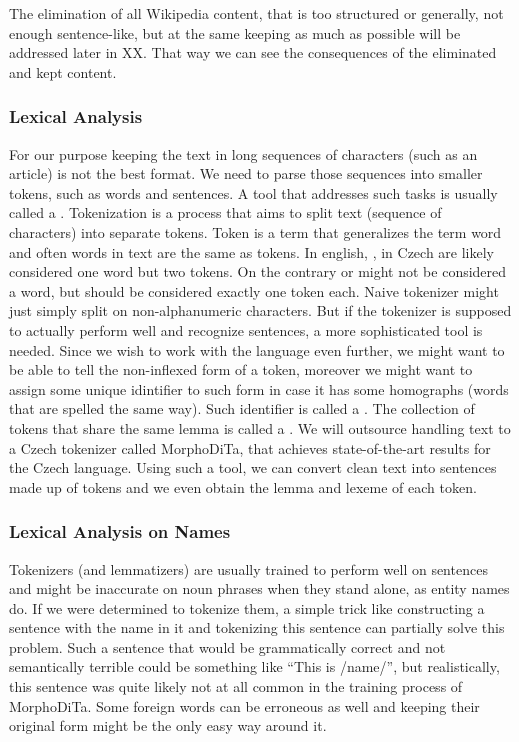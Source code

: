 The elimination of all Wikipedia content, that is too structured or generally, not enough sentence-like, but at the same keeping as much as possible will be addressed later in XX. That way we can see the consequences of the eliminated and kept content.


\subsubsection{Lexical Analysis}
For our purpose keeping the text in long sequences of characters (such as an article) is not the best format. We need to parse those sequences into smaller tokens, such as words and sentences. A tool that addresses such tasks is usually called a .
Tokenization is a process that aims to split text (sequence of characters) into separate tokens. Token is a term that generalizes the term word and often words in text are the same as tokens. In english, , in Czech  are likely considered one word but two tokens. On the contrary  or  might not be considered a word, but should be considered exactly one token each. Naive tokenizer might just simply split on non-alphanumeric characters. But if the tokenizer is supposed to actually perform well and recognize sentences, a more sophisticated tool is needed. 
Since we wish to work with the language even further, we might want to be able to tell the non-inflexed form of a token, moreover we might want to assign some unique idintifier to such form in case it has some homographs (words that are spelled the same way). Such identifier is called a . The collection of tokens that share the same lemma is called a . 
We will outsource handling text to a Czech tokenizer called MorphoDiTa, that achieves state-of-the-art results for the Czech language. Using such a tool, we can convert clean text into sentences made up of tokens and we even obtain the lemma and lexeme of each token.

\subsubsection{Lexical Analysis on Names}
Tokenizers (and lemmatizers) are usually trained to perform well on sentences and might be inaccurate on noun phrases when they stand alone, as entity names do. If we were determined to tokenize them, a simple trick like constructing a sentence with the name in it and tokenizing this sentence can partially solve this problem. Such a sentence that would be grammatically correct and not semantically terrible could be something like “This is /name/”, but realistically, this sentence was quite likely not at all common in the training process of MorphoDiTa. Some foreign words can be erroneous as well and keeping their original form might be the only easy way around it.


